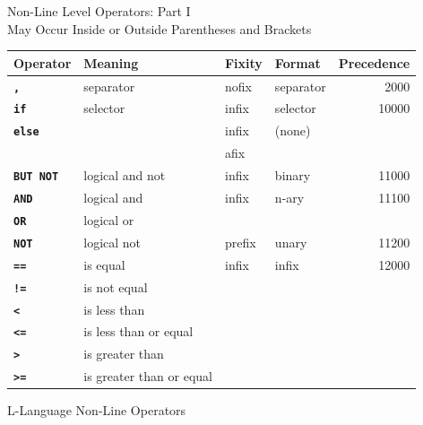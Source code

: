 \documentclass[12pt]{article}
\newcommand{\ttkey}[1]{{\tt \bfseries #1}}
\newlength{\figurewidth}
\newenvironment{boxedfigure}[1][!btp]%
	{\begin{figure*}[#1]
	 \begin{lrbox}{\figurebox}
	 \begin{minipage}{\figurewidth}

	 \vspace*{1ex}}%
	{
	 \vspace*{1ex}

	 \end{minipage}
	 \end{lrbox}

	 \centering
	 \fbox{\hspace*{0.1in}\usebox{\figurebox}\hspace*{0.1in}}
	 \end{figure*}}
\begin{document}
\begin{boxedfigure}[!p]
\begin{center}
Non-Line Level Operators: Part I \\
May Occur Inside or Outside Parentheses and Brackets
\\[1ex]
\begin{tabular}{|l|l|l|l|r|}
\hline
Operator & Meaning & Fixity & Format & Precedence \\
\hline
\ttkey{,} & separator & nofix & separator & 2000
\\\hline
\ttkey{if} & selector & infix & selector & 10000
\\\cline{1-1}\cline{3-4}
\ttkey{else} & & infix & (none) & \\
             & & afix & &
\\\hline
\ttkey{BUT NOT} & logical and not & infix & binary & 11000
\\\hline
\ttkey{AND} & logical and & infix & n-ary & 11100
\\\cline{1-2}
\ttkey{OR}  & logical or  & & &
\\\hline
\ttkey{NOT}  & logical not & prefix & unary & 11200
\\\hline
\ttkey{==}  & is equal & infix & infix & 12000
\\\cline{1-2}
\ttkey{!=}  & is not equal & & &
\\\cline{1-2}
\ttkey{<}  & is less than & & &
\\\cline{1-2}
\ttkey{<=}  & is less than or equal & & &
\\\cline{1-2}
\ttkey{>}  & is greater than & & &
\\\cline{1-2}
\ttkey{>=}  & is greater than or equal & & &
\\\hline

\end{tabular}
\end{center}

\caption{L-Language Non-Line Operators}
\label{L-LANGUAGE-NON-LINE-OPERATORS-1}
\end{boxedfigure}

\clearpage
\end{document}
